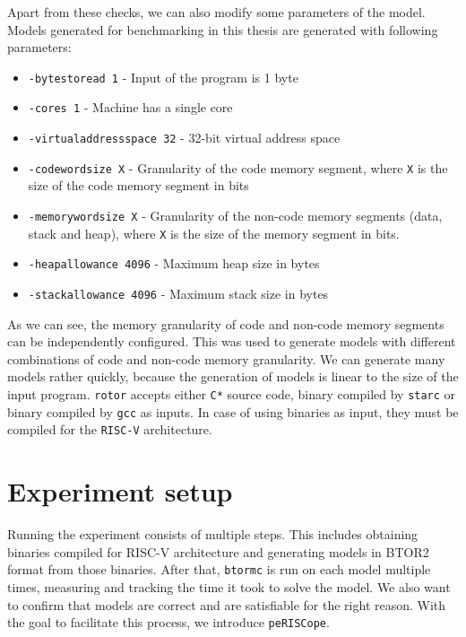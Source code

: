 \documentclass[12pt]{article}
\begin{document}
Apart from these checks, we can also modify some parameters of the model.
Models generated for benchmarking in this thesis are generated with following
parameters: 

\begin{itemize}
    \item \texttt{-bytestoread 1} - Input of the program is 1 byte
    \item \texttt{-cores 1} - Machine has a single core
    \item \texttt{-virtualaddressspace 32} - 32-bit virtual address space
    \item \texttt{-codewordsize X} - Granularity of the code memory segment,
        where \texttt{X} is the size of the code memory segment in bits
    \item \texttt{-memorywordsize X} - Granularity of the non-code memory
        segments (data, stack and heap), where \texttt{X} is the size of the
        memory segment in bits.
    \item \texttt{-heapallowance 4096} - Maximum heap size in bytes
    \item \texttt{-stackallowance 4096} - Maximum stack size in bytes
\end{itemize}

As we can see, the memory granularity of code and non-code memory segments can
be independently configured. This was used to generate models with different
combinations of code and non-code memory granularity. We can generate many 
models rather quickly, because the generation of models is linear to the size
of the input program. \texttt{rotor} accepts either \texttt{C*} source code,
binary compiled by \texttt{starc} or binary compiled by \texttt{gcc} as inputs.
In case of using binaries as input, they must be compiled for the
\texttt{RISC-V} architecture.


\section{Experiment setup}

Running the experiment consists of multiple steps. This includes obtaining
binaries compiled for RISC-V architecture and generating models in BTOR2 format
from those binaries. After that, \texttt{btormc} is run on each model multiple
times, measuring and tracking the time it took to solve the model. We also want
to confirm that models are correct and are satisfiable for the right reason.
With the goal to facilitate this process, we introduce \texttt{peRISCope}.
\end{document}

